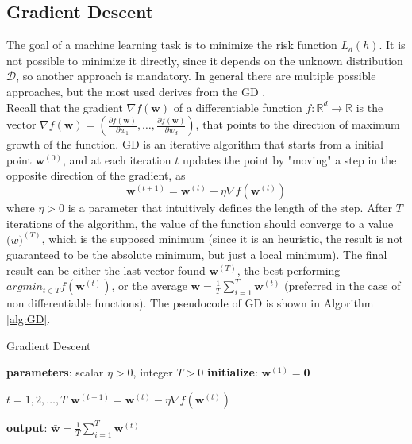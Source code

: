 \subsection{Gradient Descent}

The goal of a machine learning task is to minimize the risk function $L_d(h)$. It is not possible to minimize it directly, since it depends on the unknown distribution $\mathcal{D}$, so another approach is mandatory. In general there are multiple possible approaches, but the most used derives from the \ac{GD} \cite{article-gs-sgd}. \\
Recall that the gradient $\nabla f(\mathbf{w})$ of a differentiable function $f: \mathbb{R}^d \rightarrow \mathbb{R}$ is the vector  $\nabla f(\mathbf{w}) = \left( \frac{\partial f(\mathbf{w})}{\partial w_1}, \dots, \frac{\partial f(\mathbf{w})}{\partial w_d} \right)$, that points to the direction of maximum growth of the function. \ac{GD} is an iterative algorithm that starts from a initial point $\mathbf{w}^{(0)}$, and at each iteration $t$ updates the point by "moving" a step in the opposite direction of the gradient, as
\[ \mathbf{w}^{(t+1)} = \mathbf{w}^{(t)} - \eta \nabla f(\mathbf{w}^{(t)}) \]
where $\eta > 0$ is a parameter that intuitively defines the length of the step. After $T$ iterations of the algorithm, the value of the function should converge to a value $\mathbf(w)^{(T)}$, which is the supposed minimum (since it is an heuristic, the result is not guaranteed to be the absolute minimum, but just a local minimum). The final result can be either the last vector found $\mathbf{w}^{(T)}$, the best performing $argmin_{t \in T} f(\mathbf{w}^{(t)})$, or the average $\mathbf{\bar{w}} = \frac{1}{T} \sum_{i=1}^{T} \mathbf{w}^{(t)}$ (preferred in the case of non differentiable functions). The pseudocode of \ac{GD} is shown in Algorithm \ref{alg:GD}.

\begin{algorithm}
\caption{Gradient Descent}\label{alg:GD}
\begin{algorithmic}[1]
	\State \textbf{parameters}: scalar $\eta > 0$, integer $T>0$
	\State \textbf{initialize}: $\mathbf{w}^{(1)} = \mathbf{0}$
	
	\For $t = 1, 2, \dots , T$
	\State $\mathbf{w}^{(t+1)} = \mathbf{w}^{(t)} - \eta \nabla f(\mathbf{w}^{(t)})$
	\EndFor
	
	\State \textbf{output}: $\mathbf{\bar{w}} = \frac{1}{T} \sum_{i=1}^{T} \mathbf{w}^{(t)}$
\end{algorithmic}
\end{algorithm}


